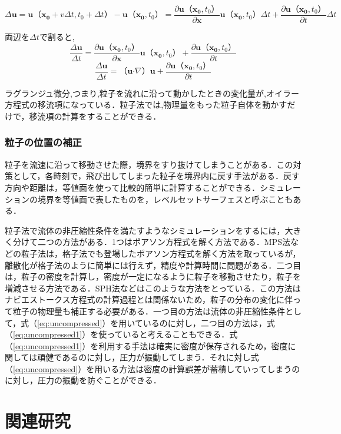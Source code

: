 \documentclass[a4j,12pt]{jreport}
\begin{document}
$$ \varDelta \bm{u} = \bm{u}（\bm{x_0}+v\varDelta t,t_0+\varDelta t） - \bm{u}（\bm{x_0},t_0） = \frac{\partial \bm{u}（\bm{x_0},t_0）}{\partial \bm{x}}\bm{u}（\bm{x_0},t_0）\varDelta t + \frac{\partial \bm{u}（\bm{x_0},t_0）}{\partial t}\varDelta t$$

両辺を$\varDelta t$で割ると,
$$ \frac{\varDelta \bm{u}}{\varDelta t} = \frac{\partial \bm{u}（\bm{x_0},t_0）}{\partial \bm{x}}\bm{u}（\bm{x_0},t_0） + \frac{\partial \bm{u}（\bm{x_0},t_0）}{\partial t}$$
$$ \frac{\varDelta \bm{u}}{\varDelta t} = （\bm{u}\boldsymbol{\cdot}\nabla）\bm{u} + \frac{\partial \bm{u}（\bm{x_0},t_0）}{\partial t}$$

ラグランジュ微分,つまり,粒子を流れに沿って動かしたときの変化量が,オイラー方程式の移流項になっている．粒子法では,物理量をもった粒子自体を動かすだけで，移流項の計算をすることができる．

\subsubsection{粒子の位置の補正} \label{subsec:fixparticlepos}
粒子を流速に沿って移動させた際，境界をすり抜けてしまうことがある．この対策として，各時刻で，飛び出してしまった粒子を境界内に戻す手法がある．戻す方向や距離は，等値面を使って比較的簡単に計算することができる．シミュレーションの境界を等値面で表したものを，レベルセットサーフェスと呼ぶこともある．

粒子法で流体の非圧縮性条件を満たすようなシミュレーションをするには，大きく分けて二つの方法がある．1つはポアソン方程式を解く方法である．MPS法などの粒子法は，格子法でも登場したポアソン方程式を解く方法を取っているが，離散化が格子法のように簡単には行えず，精度や計算時間に問題がある．二つ目は，粒子の密度を計算し，密度が一定になるように粒子を移動させたり，粒子を増減させる方法である．SPH法などはこのような方法をとっている．この方法はナビエストークス方程式の計算過程とは関係ないため，粒子の分布の変化に伴って粒子の物理量も補正する必要がある．一つ目の方法は流体の非圧縮性条件として，式（\ref{eq:uncompressed}）を用いているのに対し，二つ目の方法は，式（\ref{eq:uncompressed1}）を使っていると考えることもできる．式（\ref{eq:uncompressed1}）を利用する手法は確実に密度が保存されるため，密度に関しては頑健であるのに対し，圧力が振動してしまう．それに対し式（\ref{eq:uncompressed}）を用いる方法は密度の計算誤差が蓄積していってしまうのに対し，圧力の振動を防ぐことができる．

\section{関連研究} \label{sec:reratedworks}
\end{document}
